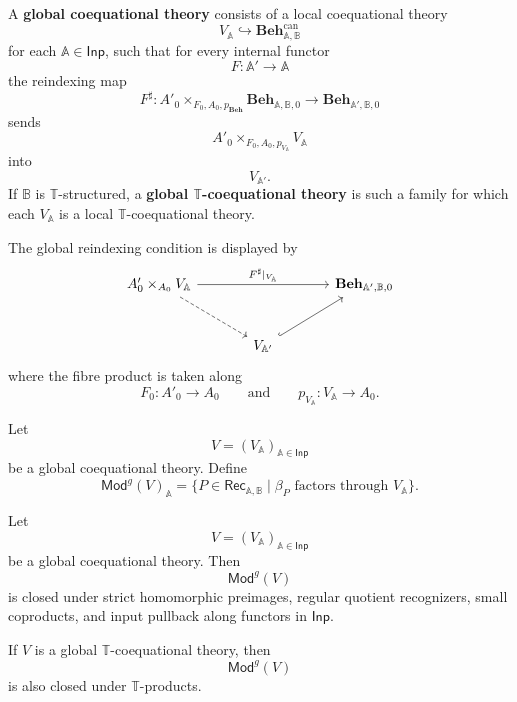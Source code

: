 \begin{definition}
\label{def:global-mealy-coequational-theory}
    A \textbf{global coequational theory} consists of a local coequational theory
    \[
        V_{\mathbb A}\hookrightarrow
        \mathbf{Beh}^{\mathrm{can}}_{\mathbb A,\mathbb B}
    \]
    for each \(\mathbb A\in\mathsf{Inp}\), such that for every internal functor
    \[
        F:\mathbb A'\to\mathbb A
    \]
    the reindexing map
    \[
        F^\sharp:
        A'_0\times_{F_0,A_0,p_{\mathbf{Beh}}}
        \mathbf{Beh}_{\mathbb A,\mathbb B,0}
        \to
        \mathbf{Beh}_{\mathbb A',\mathbb B,0}
    \]
    sends
    \[
        A'_0\times_{F_0,A_0,p_{V_{\mathbb A}}}V_{\mathbb A}
    \]
    into
    \[
        V_{\mathbb A'}.
    \]
    If \(\mathbb B\) is \(\mathbb T\)-structured, a \textbf{global
    \(\mathbb T\)-coequational theory} is such a family for which each
    \(V_{\mathbb A}\) is a local \(\mathbb T\)-coequational theory.
\end{definition}

The global reindexing condition is displayed by
\[
\begin{tikzcd}[column sep=large, row sep=large]
    A'_0\times_{A_0}V_{\mathbb A}
        \arrow[rr, "{F^\sharp|_{V_{\mathbb A}}}"]
        \arrow[dr, dashed]
    &&
    \mathbf{Beh}_{\mathbb A',\mathbb B,0}
    \\
    &
    V_{\mathbb A'}
        \arrow[ur, hook]
    &
\end{tikzcd}
\]
where the fibre product is taken along
\[
    F_0:A'_0\to A_0
    \qquad\text{and}\qquad
    p_{V_{\mathbb A}}:V_{\mathbb A}\to A_0.
\]

\begin{definition}
\label{def:global-models}
    Let
    \[
        V=(V_{\mathbb A})_{\mathbb A\in\mathsf{Inp}}
    \]
    be a global coequational theory. Define
    \[
        \mathsf{Mod}^{g}(V)_{\mathbb A}
        =
        \{P\in\mathsf{Rec}_{\mathbb A,\mathbb B}
          \mid
          \beta_P\text{ factors through }V_{\mathbb A}\}.
    \]
\end{definition}

\begin{theorem}
\label{thm:global-coequational-closure}
    Let
    \[
        V=(V_{\mathbb A})_{\mathbb A\in\mathsf{Inp}}
    \]
    be a global coequational theory. Then
    \[
        \mathsf{Mod}^{g}(V)
    \]
    is closed under strict homomorphic preimages, regular quotient recognizers,
    small coproducts, and input pullback along functors in \(\mathsf{Inp}\).

    If \(V\) is a global \(\mathbb T\)-coequational theory, then
    \[
        \mathsf{Mod}^{g}(V)
    \]
    is also closed under \(\mathbb T\)-products.
\end{theorem}

